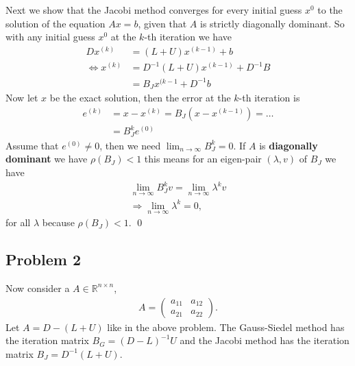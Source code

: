 \subsubsection{}
Next we show that the Jacobi method converges for every initial guess
$x^0$ to the solution of the equation $Ax = b$, given that $A$ is
strictly diagonally dominant. So with any initial guess $x^0$ at the $k$-th
iteration we have
\begin{align}
    Dx^{(k)} &= (L+U)x^{(k-1)} + b\\
    \Leftrightarrow x^{(k)} &= D^{-1}(L+U)x^{(k-1)}+D^{-1}B \\
                            &= B_J x^{(k-1} + D^{-1}b
\end{align}
Now let $x$ be the exact solution, then the error at the $k$-th iteration is
\begin{align}
    e^{(k)} &= x - x^{(k)} = B_J\left( x - x^{(k-1)} \right) = \ldots\\
            &= B_J^k e^{(0)}
\end{align}
Assume that $e^{(0)} \neq 0$, then we need $\lim_{n \to \infty}B_J^k = 0$. If
$A$ is \textbf{diagonally dominant} we have $\rho(B_J) < 1$ this means for an
eigen-pair $\left(\lambda, v \right) $ of $B_J$ we have
\begin{align}
    \lim_{n \to \infty}B_J^k v = \lim_{n \to \infty}\lambda^k v \\
    \Rightarrow \lim_{n \to \infty}\lambda^k = 0,
\end{align}
for all $\lambda$ because $\rho(B_J) < 1$. \qed
\subsection{Problem 2}
Now consider a $A \in \mathbb{R}^{n \times n}$,
\begin{align}
    A = \begin{pmatrix} a_{11} & a_{12} \\ a_{21} & a_{22} \end{pmatrix}.
\end{align}
Let $A = D - (L + U)$ like in the above problem.
The Gauss-Siedel method has the iteration matrix $B_G = (D - L)^{-1} U$ and
the Jacobi method has the iteration matrix $B_J = D^{-1}(L + U)$.
